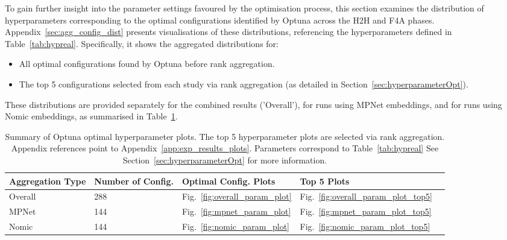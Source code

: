 \documentclass[10pt,oneside]{report}
\begin{document}
To gain further insight into the parameter settings favoured by the optimisation process, this section examines the distribution of hyperparameters corresponding to the optimal configurations identified by Optuna across the H2H and F4A phases. Appendix~\ref{sec:agg_config_dist} presents visualisations of these distributions, referencing the hyperparameters defined in Table~\ref{tab:hypreal}. Specifically, it shows the aggregated distributions for:
\begin{itemize}
    \item All optimal configurations found by Optuna before rank aggregation.
    \item The top 5 configurations selected from each study via rank aggregation (as detailed in Section~\ref{sec:hyperparameterOpt}).
\end{itemize}
These distributions are provided separately for the combined results ('Overall'), for runs using MPNet embeddings, and for runs using Nomic embeddings, as summarised in Table~\ref{tab:dist-hyp}.


\begin{table}[H]
    \centering
    \begin{adjustbox}{max width=\textwidth}
    \begin{tabular}{l l l l l}
        \toprule
        \textbf{Aggregation Type} & \textbf{Number of Config.} & \textbf{Optimal Config. Plots} & \textbf{Top 5 Plots} \\
        \midrule
        Overall        & 288 & Fig.~\ref{fig:overall_param_plot} & Fig.~\ref{fig:overall_param_plot_top5} \\
        MPNet          & 144 & Fig.~\ref{fig:mpnet_param_plot} & Fig.~\ref{fig:mpnet_param_plot_top5} \\
        Nomic          & 144 & Fig.~\ref{fig:nomic_param_plot} & Fig.~\ref{fig:nomic_param_plot_top5} \\
        \bottomrule
    \end{tabular}
    \end{adjustbox}
    \caption{Summary of Optuna optimal hyperparameter plots. The top 5 hyperparameter plots are selected via rank aggregation. Appendix references point to Appendix~\ref{app:exp_results_plots}. Parameters correspond to Table~\ref{tab:hypreal} See Section~\ref{sec:hyperparameterOpt} for more information.}
    \label{tab:dist-hyp}
\end{table}
\end{document}
